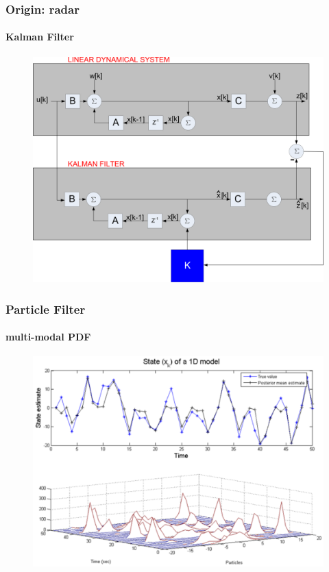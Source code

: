 \begin{frame}
\frametitle{Origin: radar}
\framesubtitle{Kalman Filter}
\logoCSIPCPL\mypagenum
	\begin{figure}
		\includegraphics[width=1.0\textwidth]{thesis/TRK_KalmanFilter_blockDiagram.pdf}
	\end{figure}
\end{frame}

\begin{frame}
\frametitle{Particle Filter}
\framesubtitle{multi-modal PDF}
\logoCSIPCPL\mypagenum
	\begin{figure}
		\includegraphics[width=1.0\textwidth]{thesis/TRK_ParticleFilter_multimodalPDF.pdf}
	\end{figure}	
\end{frame}



